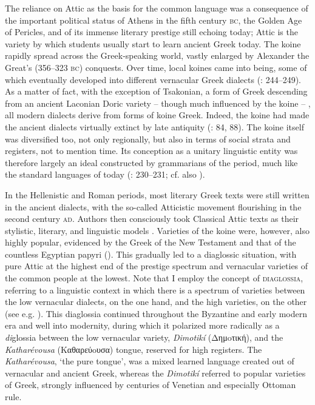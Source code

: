 The reliance on Attic as the basis for the common language was a consequence of the important political status of Athens in the fifth century \textsc{bc}, the Golden Age of Pericles, and of its immense literary prestige still echoing today; Attic is the variety by which students usually start to learn ancient Greek today. The koine rapidly spread across the Greek-speaking world, vastly enlarged by Alexander the Great’s (356–323 \textsc{bc}) conquests. Over time, local koines came into being, some of which eventually developed into different vernacular Greek dialects (\citealt{Brixhe2010}: 244–249). As a matter of fact, with the exception of Tsakonian, a form of Greek descending from an ancient Laconian Doric variety – though much influenced by the koine – \citep[88]{Horrocks2010}, all modern dialects derive from forms of koine Greek. Indeed, the koine had made the ancient dialects virtually extinct by late antiquity (\citealt{Horrocks2010}: 84, 88). The koine itself was diversified too, not only regionally, but also in terms of social strata and registers, not to mention time. Its conception as a unitary linguistic entity was therefore largely an ideal constructed by grammarians of the period, much like the standard languages of today (\citealt{Brixhe2010}: 230–231; cf. also \citealt{VanRooy2016b}).

In the Hellenistic and Roman periods, most literary Greek texts were still written in the ancient dialects, with the so-called Atticistic movement flourishing in the second century \textsc{ad}. Authors then consciously took Classical Attic texts as their stylistic, literary, and linguistic models \citep[42]{Whitmarsh2005}. Varieties of the koine were, however, also highly popular, evidenced by the Greek of the New Testament and that of the countless Egyptian papyri (\citealt{Evans2010}). This gradually led to a diaglossic situation, with pure Attic at the highest end of the prestige spectrum and vernacular varieties of the common people at the lowest. Note that I employ the concept of \textsc{diaglossia}, referring to a linguistic context in which there is a spectrum of varieties between the low vernacular dialects, on the one hand, and the high varieties, on the other (see e.g. \citealt{Auer2005,Rutten2016}). This diaglossia continued throughout the Byzantine and early modern era and well into modernity, during which it polarized more radically as a \textit{di}glossia between the low vernacular variety, \textit{Dimotikí} (Δημoτική), and the \textit{Katharévousa} (Kαθαρεύoυσα) tongue, reserved for high registers. The \textit{Katharévousa}, ‘the pure tongue’, was a mixed learned language created out of vernacular and ancient Greek, whereas the \textit{Dimotikí} referred to popular varieties of Greek, strongly influenced by centuries of Venetian and especially Ottoman rule.

